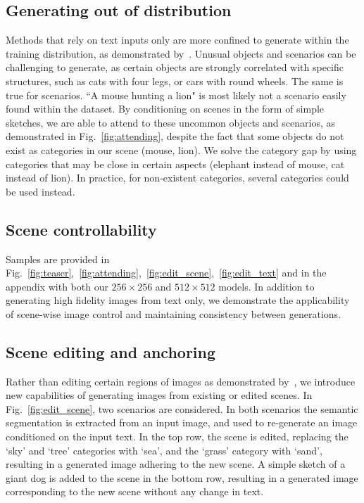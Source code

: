 \documentclass[final]{cvpr}
\begin{document}
\subsection{Generating out of distribution}
Methods that rely on text inputs only are more confined to generate within the training distribution, as demonstrated by~\cite{nichol2021glide}. Unusual objects and scenarios can be challenging to generate, as certain objects are strongly correlated with specific structures, such as cats with four legs, or cars with round wheels. The same is true for scenarios. ``A mouse hunting a lion" is most likely not a scenario easily found within the dataset. By conditioning on scenes in the form of simple sketches, we are able to attend to these uncommon objects and scenarios, as demonstrated in Fig.~\ref{fig:attending}, despite the fact that some objects do not exist as categories in our scene (mouse, lion). We solve the category gap by using categories that may be close in certain aspects (elephant instead of mouse, cat instead of lion). In practice, for non-existent categories, several categories could be used instead.

\subsection{Scene controllability}
Samples are provided in Fig.~\ref{fig:teaser},~\ref{fig:attending},~\ref{fig:edit_scene},~\ref{fig:edit_text} and in the appendix with both our $256\times256$ and $512\times512$ models. In addition to generating high fidelity images from text only, we demonstrate the applicability of scene-wise image control and maintaining consistency between generations.

\subsection{Scene editing and anchoring} 
Rather than editing certain regions of images as demonstrated by~\cite{ramesh2021zero}, we introduce new capabilities of generating images from existing or edited scenes. In Fig.~\ref{fig:edit_scene}, two scenarios are considered. In both scenarios the semantic segmentation is extracted from an input image, and used to re-generate an image conditioned on the input text. In the top row, the scene is edited, replacing the `sky' and `tree' categories with `sea', and the `grass' category with `sand', resulting in a generated image adhering to the new scene. A simple sketch of a giant dog is added to the scene in the bottom row, resulting in a generated image corresponding to the new scene without any change in text.
\end{document}

